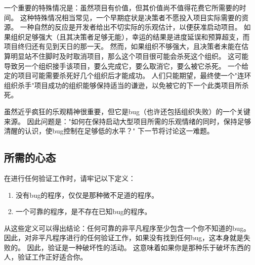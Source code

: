 \QuickQuizEnd

一个重要的特殊情况是：虽然项目有价值，但其价值尚不值得花费它所需要的时间。
这种特殊情况相当常见，一个早期症状是决策者不愿投入项目实际需要的资源。
一种自然的反应是开发者给出不切实际的乐观估计，以便获准启动项目。
如果组织足够强大（且其决策者足够无能），幸运的结果是进度延误和预算超支，而项目终归还有见到天日的那一天。
然而，如果组织不够强大，且决策者未能在估算明显站不住脚时及时取消项目，那么这个项目很可能会杀死这个组织。
这可能导致另一个组织接手该项目，要么完成它，要么取消它，要么被它杀死。
一个给定的项目可能需要杀死好几个组织后才能成功。
人们只能期望，最终使一个"连环组织杀手"项目成功的组织能够保持适当的谦逊，以免被它的下一个此类项目所杀死。

\QuickQuizEnd

虽然近乎疯狂的乐观精神很重要，但它是bug（也许还包括组织失败）的一个关键来源。
因此问题是："如何在保持启动大型项目所需的乐观情绪的同时，保持足够清醒的认识，使bug控制在足够低的水平？"
下一节将讨论这一难题。

\subsection{所需的心态}
\label{sec:debugging:Required Mindset}

在进行任何验证工作时，请牢记以下定义：

\begin{enumerate}
\item	没有bug的程序，仅仅是那种微不足道的程序。
\item	一个可靠的程序，是不存在已知bug的程序。
\end{enumerate}

从这些定义可以得出结论：任何可靠的非平凡程序至少包含一个你不知道的bug。
因此，对非平凡程序进行的任何验证工作，如果没有找到任何bug，这本身就是失败的。
因此，验证是一种破坏性的活动。
这意味着如果你是那种乐于破坏东西的人，验证工作正好适合你。

